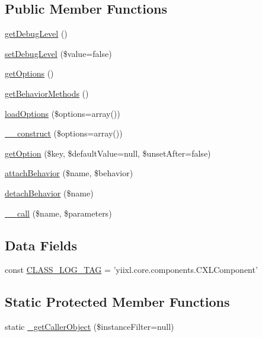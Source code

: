 \subsection*{Public Member Functions}
\begin{DoxyCompactItemize}
\item 
\hyperlink{classCXLComponent_a122db96cedfc221cf187ce4328f992f7}{getDebugLevel} ()
\item 
\hyperlink{classCXLComponent_a91ba7d911e2c3852a048f4022c45ec9e}{setDebugLevel} (\$value=false)
\item 
\hyperlink{classCXLComponent_a1a49b8dded6e91a52e2fd07195d334da}{getOptions} ()
\item 
\hyperlink{classCXLComponent_a50138660370da467322f8f3965008b14}{getBehaviorMethods} ()
\item 
\hyperlink{classCXLComponent_ad51d235c20d44a485f9f00f2c86a5ea9}{loadOptions} (\$options=array())
\item 
\hyperlink{classCXLComponent_aa7f5a18682ecb8e0dc450e26cebfaa37}{\_\-\_\-construct} (\$options=array())
\item 
\hyperlink{classCXLComponent_ad1145e067eca389073867be1a9d5d57e}{getOption} (\$key, \$defaultValue=null, \$unsetAfter=false)
\item 
\hyperlink{classCXLComponent_ad93e793964a65dfac40131c7cf7fe901}{attachBehavior} (\$name, \$behavior)
\item 
\hyperlink{classCXLComponent_a568bb8ef71e4cc61fd38a4c6140cb8e6}{detachBehavior} (\$name)
\item 
\hyperlink{classCXLComponent_ae3c1612573015dbb405087f657944fe6}{\_\-\_\-call} (\$name, \$parameters)
\end{DoxyCompactItemize}
\subsection*{Data Fields}
\begin{DoxyCompactItemize}
\item 
const \hyperlink{classCXLComponent_aa607ab5e557e6ebb60b85c5a20ad067f}{CLASS\_\-LOG\_\-TAG} = 'yiixl.core.components.CXLComponent'
\end{DoxyCompactItemize}
\subsection*{Static Protected Member Functions}
\begin{DoxyCompactItemize}
\item 
static \hyperlink{classCXLComponent_a18dc38882c1e91ddb65892e4fad6d68f}{\_\-getCallerObject} (\$instanceFilter=null)
\end{DoxyCompactItemize}

